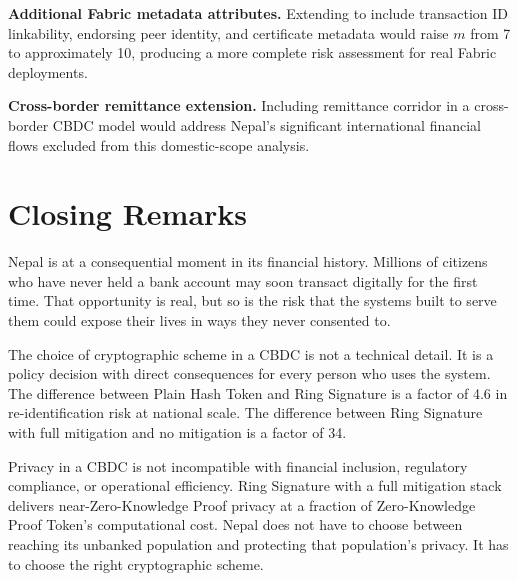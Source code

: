 \textbf{Additional Fabric metadata attributes.} Extending to
include transaction ID linkability, endorsing peer identity, and
certificate metadata would raise $m$ from 7 to approximately 10,
producing a more complete risk assessment for real Fabric
deployments.

\textbf{Cross-border remittance extension.} Including remittance
corridor in a cross-border CBDC model would address Nepal's
significant international financial flows excluded from this
domestic-scope analysis.

\section{Closing Remarks}
\label{sec:closing}

Nepal is at a consequential moment in its financial history.
Millions of citizens who have never held a bank account may soon
transact digitally for the first time. That opportunity is real,
but so is the risk that the systems built to serve them could
expose their lives in ways they never consented to.

The choice of cryptographic scheme in a CBDC is not a technical
detail. It is a policy decision with direct consequences for
every person who uses the system. The difference between Plain
Hash Token and Ring Signature is a factor of 4.6 in
re-identification risk at national scale. The difference between
Ring Signature with full mitigation and no mitigation is a
factor of 34.

Privacy in a CBDC is not incompatible with financial inclusion,
regulatory compliance, or operational efficiency. Ring Signature
with a full mitigation stack delivers near-Zero-Knowledge Proof privacy at a
fraction of Zero-Knowledge Proof Token's computational cost. Nepal does not have to
choose between reaching its unbanked population and protecting
that population's privacy. It has to choose the right
cryptographic scheme.